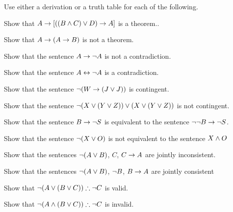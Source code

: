 \practiceproblems
\noindent\problempart Use either a derivation or a truth table for each of the following.
\begin{compactlist}%
\item Show that $A \rightarrow [((B \wedge C) \vee D) \rightarrow A]$ is a theorem..
\item Show that $A \rightarrow (A \rightarrow B)$ is not a theorem.
\item Show that the sentence $A \rightarrow \neg{A}$ is not a contradiction.
\item Show that the sentence $A \leftrightarrow \neg A$ is a contradiction.
\item Show that the sentence $ \neg (W \rightarrow (J \vee J)) $ is contingent.
\item Show that the sentence $ \neg(X \vee (Y \vee Z)) \vee (X \vee (Y \vee Z))$ is not contingent.
 \item Show that the sentence $B \rightarrow \neg S$ is equivalent to the sentence $\neg \neg B \rightarrow \neg S$.
\item Show that the sentence $ \neg (X \vee O) $ is not equivalent to the sentence $X \wedge O$
\item Show that the sentences $\neg(A \vee B)$, $C$, $C \rightarrow A$  are jointly inconsistent.
\item Show that the sentences $\neg(A \vee B)$, $\neg{B}$, $B \rightarrow A$ are jointly consistent
\item Show that $\neg(A \vee (B \vee C)) \therefore \neg{C}$ is valid.
\item Show that $\neg(A \wedge (B \vee C)) \therefore \neg{C}$ is invalid.
\end{compactlist}


